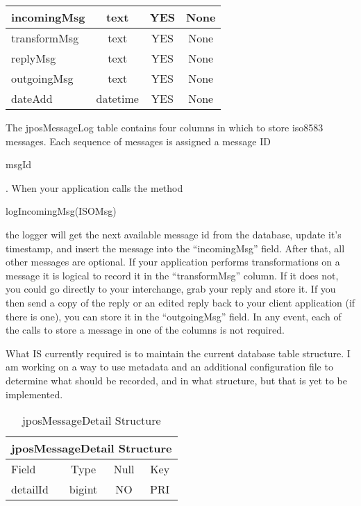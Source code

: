 \documentclass[11pt]{report}
\begin{document}
\begin{flushleft}
\begin{table}
\begin{center}
\begin{tabular}{|l|c|c|c|}
    incomingMsg
    & text
    & YES
    & None\\
    \hline

    transformMsg
    & text
    & YES
    & None\\
    \hline

    replyMsg
    & text
    & YES
    & None\\
    \hline

    outgoingMsg
    & text
    & YES
    & None\\
    \hline

    dateAdd
    & datetime
    & YES
    & None\\
    \hline
    \end{tabular}
    \end{center}
    \end{table}

    The jposMessageLog table contains four columns in which to store iso8583
    messages.  Each sequence of messages is assigned a message ID
    \begin{slshape}msgId\end{slshape}.  When your application calls the method
    \begin{slshape}logIncomingMsg(ISOMsg)\end{slshape} the logger will get the
    next available message id from the database, update it's timestamp, and
    insert the message into the ``incomingMsg'' field.  After that, all other
    messages are optional.  If your application performs transformations on a
    message it is logical to record it in the ``transformMsg'' column.  If it
    does not, you could go directly to your interchange, grab your reply and
    store it.  If you then send a copy of the reply or an edited reply back to
    your client application (if there is one), you can store it in the
    ``outgoingMsg'' field.  In any event, each of the calls to store a message
    in one of the columns is not required.  

    What IS currently required is to maintain the current database table
    structure.  I am working on a way to use metadata and an additional
    configuration file to determine what should be recorded, and in what
    structure, but that is yet to be implemented. 


    \begin{table}
    \begin{center}
    \caption{\label{jposMessageDetail} jposMessageDetail Structure}
    \vspace{1ex}
    \begin{tabular}{|l|c|c|c|} \hline
    \multicolumn{4}{|c|}{\bfseries jposMessageDetail Structure}\\ \hline
    Field & Type & Null & Key\\
    \hline\hline
    detailId
    & bigint
    & NO
    & PRI\\
    \hline


\end{tabular}
\end{center}
\end{table}
\end{flushleft}
\end{document}
